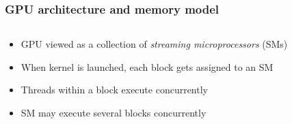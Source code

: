 \begin{frame}
\frametitle{GPU architecture and memory model}
\pause
\begin{columns}
\begin{column}{0.5\textwidth}
\begin{itemize}[<+->]
    \item GPU viewed as a collection of \emph{streaming microprocessors} (SMs)
    \item When kernel is launched, each block gets assigned to an SM
    \item Threads within a block execute concurrently
    \item SM may execute several blocks concurrently
\end{itemize}
\end{column}
\begin{column}{0.5\textwidth}
\end{column}
\end{columns}
\end{frame}

